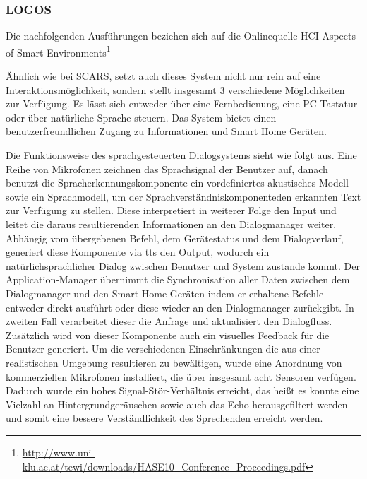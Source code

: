 \subsubsection{LOGOS}

Die nachfolgenden Ausführungen beziehen sich auf die Onlinequelle \glqq HCI Aspects of Smart Environments\grqq\footnote{\url{http://www.uni-klu.ac.at/tewi/downloads/HASE10_Conference_Proceedings.pdf}}

Ähnlich wie bei SCARS, setzt auch dieses System nicht nur rein auf eine Interaktionsmöglichkeit, sondern stellt insgesamt 3 verschiedene Möglichkeiten zur Verfügung. Es lässt sich entweder über eine Fernbedienung, eine PC-Tastatur oder über natürliche Sprache steuern. Das System bietet einen benutzerfreundlichen Zugang zu Informationen und Smart Home Geräten.

Die Funktionsweise des sprachgesteuerten Dialogsystems sieht wie folgt aus. Eine Reihe von Mikrofonen zeichnen das Sprachsignal der Benutzer auf, danach benutzt die Spracherkennungskomponente ein vordefiniertes akustisches Modell sowie ein Sprachmodell, um der \glqq Sprachverständniskomponente\grqq den erkannten Text zur Verfügung zu stellen. Diese interpretiert in weiterer Folge den Input und leitet die daraus resultierenden Informationen an den Dialogmanager weiter. Abhängig vom übergebenen Befehl, dem Gerätestatus und dem Dialogverlauf, generiert diese Komponente via \gls{tts} den Output, wodurch ein natürlichsprachlicher Dialog zwischen Benutzer und System zustande kommt. Der Application-Manager übernimmt die Synchronisation aller Daten zwischen dem Dialogmanager und den Smart Home Geräten indem er erhaltene Befehle entweder direkt ausführt oder diese wieder an den Dialogmanager zurückgibt. In zweiten Fall verarbeitet dieser die Anfrage und aktualisiert den Dialogfluss. Zusätzlich wird von dieser Komponente auch ein visuelles Feedback für die Benutzer generiert. Um die verschiedenen Einschränkungen die aus einer realistischen Umgebung resultieren zu bewältigen, wurde eine Anordnung von kommerziellen Mikrofonen installiert, die über insgesamt acht Sensoren verfügen. Dadurch wurde ein hohes Signal-Stör-Verhältnis erreicht, das heißt es konnte eine Vielzahl an Hintergrundgeräuschen sowie auch das Echo herausgefiltert werden und somit eine bessere Verständlichkeit des Sprechenden erreicht werden.

